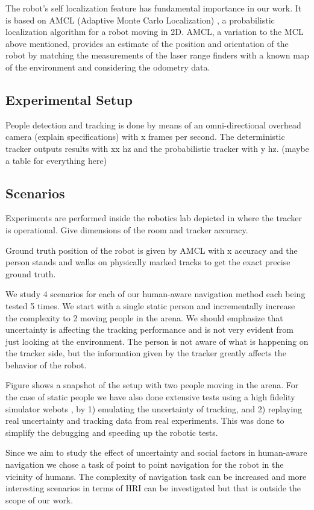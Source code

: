 The robot's self localization feature has fundamental importance in our work.
It is based on AMCL (Adaptive Monte Carlo Localization) \cite{amcl}, a probabilistic localization algorithm for a robot moving in 2D.
AMCL, a variation to the MCL above mentioned, provides an estimate of the position and orientation of the robot by matching the measurements of the laser range finders with a known map of the environment and considering the odometry data.


\subsection{Experimental Setup}
\label{sec:Experimental_setup}


People detection and tracking is done by means of an omni-directional overhead camera (explain specifications) with x frames per second. The deterministic tracker outputs results with xx hz and the probabilistic tracker with y hz. (maybe a table for everything here)
\subsection{Scenarios}
\label{sec:scenarios}

Experiments are performed inside the robotics lab depicted in where the tracker is operational. Give dimensions of the room and tracker accuracy.


Ground truth position of the robot is given by AMCL with x accuracy and the person stands and walks on physically marked tracks to get the exact precise ground truth.


We study 4 scenarios for each of our human-aware navigation method each being tested 5 times.
We start with a single static person and incrementally increase the complexity to 2 moving people in the arena. We should emphasize that uncertainty is affecting the tracking performance and is not very evident from just looking at the environment. The person is not aware of what is happening on the tracker side, but the information given by the tracker greatly affects the behavior of the robot.



Figure shows a snapshot of the setup with two people moving in the arena. For the case of static people we have also done extensive tests using a high fidelity simulator webots \cite{michel1998webots}, by 1) emulating the uncertainty of tracking, and 2) replaying real uncertainty and tracking data from real experiments. This was done to simplify the debugging and speeding up the robotic tests.

Since we aim to study the effect of uncertainty and social factors in human-aware navigation we chose a task of point to point navigation for the robot in the vicinity of humans. The complexity of navigation task can be increased and more interesting scenarios in terms of HRI can be investigated but that is outside the scope of our work.



